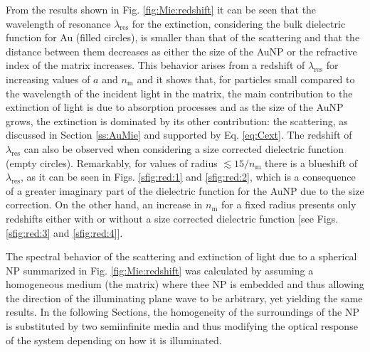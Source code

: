 From the results shown in Fig. \ref{fig:Mie:redshift} it can be seen that the wavelength of resonance  $\lambda_\text{res}$ for the extinction, considering the bulk dielectric function for Au (filled circles), is smaller than that of the scattering  and that the distance between them decreases as either the size of the AuNP or the refractive index of the matrix increases. This behavior arises from a redshift of $\lambda_\text{res}$ for increasing values of $a$ and $n_\text{m}$ and it shows that, for particles small compared to the wavelength of the incident light in the matrix, the main contribution to the extinction of light  is due to absorption processes and as the size of the AuNP grows, the extinction is dominated by its other contribution: the scattering, as discussed in Section \ref{ss:AuMie} and supported by Eq. \eqref{eq:Cext}. The redshift of   $\lambda_\text{res}$ can also be observed when considering a size corrected dielectric function (empty circles). Remarkably, for values of radius $\lesssim 15/n_\text{m}$ there is a blueshift of $\lambda_\text{res}$, as it can be seen in Figs. \ref{sfig:red:1} and \ref{sfig:red:2}, which is a consequence of a greater imaginary part of the dielectric function for the AuNP due to the size correction. On the other hand, an increase in $n_\text{m}$ for a fixed radius presents only redshifts either with or without a size corrected dielectric function [see Figs. \ref{sfig:red:3} and  \ref{sfig:red:4}].

The spectral behavior of the scattering and extinction of light due to a spherical NP summarized in Fig. \ref{fig:Mie:redshift} was calculated by assuming a homogeneous medium (the matrix) where thee NP is embedded and thus allowing the direction of the illuminating plane wave to be arbitrary, yet yielding the same results. In the following Sections, the homogeneity of the surroundings of the NP is substituted by two semiinfinite media and thus modifying the optical response of the system depending on how it is illuminated.
